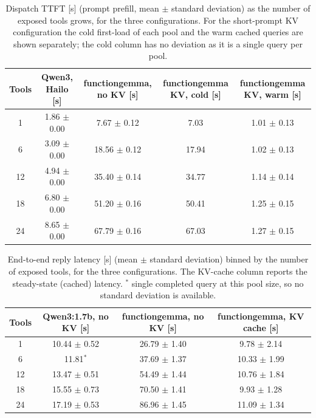 \begin{table}[H]
\centering
\caption{Dispatch TTFT [s] (prompt prefill, mean $\pm$ standard deviation) as the
number of exposed tools grows, for the three configurations. For the short-prompt KV
configuration the cold first-load of each pool and the warm cached queries are shown
separately; the cold column has no deviation as it is a single query per pool.}
\label{tab:ttft_cmp}
\begin{tabular}{ccccc}
\toprule
\textbf{Tools} & \textbf{Qwen3, Hailo [s]} & \textbf{functiongemma, no KV [s]} & \textbf{functiongemma KV, cold [s]} & \textbf{functiongemma KV, warm [s]} \\
\midrule
1 & 1.86 $\pm$ 0.00 & 7.67 $\pm$ 0.12 & 7.03 & 1.01 $\pm$ 0.13 \\
6 & 3.09 $\pm$ 0.00 & 18.56 $\pm$ 0.12 & 17.94 & 1.02 $\pm$ 0.13 \\
12 & 4.94 $\pm$ 0.00 & 35.40 $\pm$ 0.14 & 34.77 & 1.14 $\pm$ 0.14 \\
18 & 6.80 $\pm$ 0.00 & 51.20 $\pm$ 0.16 & 50.41 & 1.25 $\pm$ 0.15 \\
24 & 8.65 $\pm$ 0.00 & 67.79 $\pm$ 0.16 & 67.03 & 1.27 $\pm$ 0.15 \\
\bottomrule
\end{tabular}
\end{table}

\begin{table}[H]
\centering
\caption{End-to-end reply latency [s] (mean $\pm$ standard deviation) binned by the
number of exposed tools, for the three configurations. The KV-cache column reports
the steady-state (cached) latency. $^{*}$ single completed query at this pool size,
so no standard deviation is available.}
\label{tab:e2e}
\begin{tabular}{cccc}
\toprule
\textbf{Tools} & \textbf{Qwen3:1.7b, no KV [s]} & \textbf{functiongemma, no KV [s]} & \textbf{functiongemma, KV cache [s]} \\
\midrule
1 & 10.44 $\pm$ 0.52 & 26.79 $\pm$ 1.40 & 9.78 $\pm$ 2.14 \\
6 & 11.81$^{*}$ & 37.69 $\pm$ 1.37 & 10.33 $\pm$ 1.99 \\
12 & 13.47 $\pm$ 0.51 & 54.49 $\pm$ 1.44 & 10.76 $\pm$ 1.84 \\
18 & 15.55 $\pm$ 0.73 & 70.50 $\pm$ 1.41 & 9.93 $\pm$ 1.28 \\
24 & 17.19 $\pm$ 0.53 & 86.96 $\pm$ 1.45 & 11.09 $\pm$ 1.34 \\
\bottomrule
\end{tabular}
\end{table}

